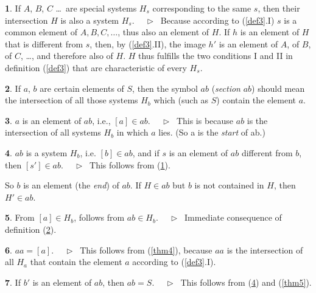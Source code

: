 \documentclass[leqno,hidelinks,a4paper]{article}
\theoremstyle{definition}
\newtheorem{sat}{\protect\satname}
\newtheorem{tef}[sat]{\protect\tefname}
\newcommand{\satname}{}
\newcommand{\tefname}{}
\renewcommand{\satname}{\hspace{-4pt}. Satz}%
\renewcommand{\tefname}{\hspace{-4pt}. Definition}%
\renewcommand{\satname}{\hspace{-4pt}. Theorem}%
\renewcommand{\tefname}{\hspace{-4pt}. Definition}%
\newcommand\Beweis{\newline $ \phantom{'.'} \rhd \ $}%
\newcommand{\partof}{\in}
\begin{document}
\begin{paracol}{2}
\begin{sat}\label{thm8}
If $A$, $B$, $C$ \ldots\ are special systems $H_s$ corresponding to the same $s$,
then their intersection $H$ is also a system $H_s$.
\Beweis
Because according to (\ref{def3}.I) $s$ is a common element of $A, B, C, \ldots$,
thus also an element of $H$. If $h$ is an element of $H$ that is different from
$s$, then, by  (\ref{def3}.II), the image $h'$ is an element of $A$, of $B$, of
$C$, \ldots, and therefore also of $H$. $H$ thus fulfills the two conditions I
and II in definition (\ref{def3}) that are characteristic of every $H_s$.
\end{sat}

\begin{tef}\label{def9}
If $a$, $b$ are certain elements of $S$, then the symbol $ab$ (\emph{section} $ab$)
should mean the intersection of all those systems $H_b$ which (such as $S$)
contain the element $a$.%
\end{tef}

\newpage

\begin{sat}\label{thm10}
$a$ is an element of $ab$, i.e., $[a] \partof ab$.
\Beweis
This is because $ab$ is the intersection of all systems $H_b$ in which $a$ lies.
(So a is the \emph{start} of ab.)
\end{sat}

\begin{sat}\label{thm11}
$ab$ is a system $H_b$, i.e. $[b] \partof ab$, and if $s$ is an element of $ab$
different from $b$, then $[s'] \partof ab$.
\Beweis
This follows from (\ref{thm8}).
\end{sat}

So $b$ is an element (the \emph{end}) of $ab$. If $H \partof ab$ but $b$ is not
contained in $H$, then $H' \partof ab$.

\begin{sat}\label{thm12}
From $[a] \partof H_b$, follows from $ab \partof H_b$.
\Beweis
Immediate consequence of definition (\ref{def9}).
\end{sat}

\begin{sat}\label{thm13}
$aa = [a]$.
\Beweis
This follows from (\ref{thm4}), because $aa$ is the intersection of all $H_a$
that contain the element $a$ according to (\ref{def3}.I).
\end{sat}

\begin{sat}\label{thm14}
If $b'$ is an element of $ab$, then $ab = S$.
\Beweis
This follows from (\ref{thm11}) and (\ref{thm5}).
\end{sat}


\end{paracol}
\end{document}
